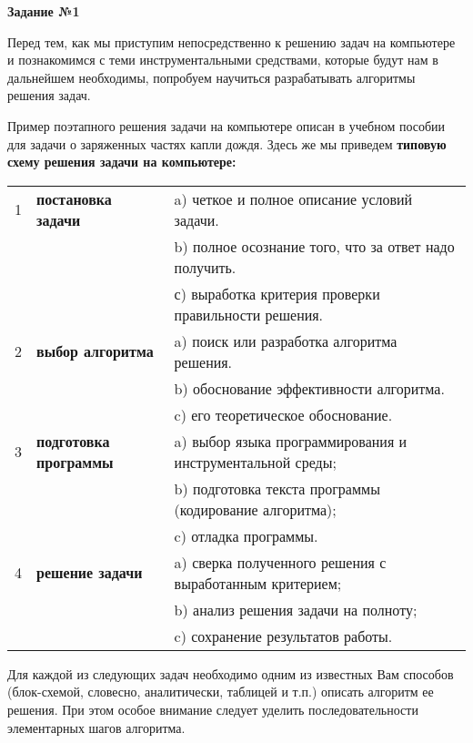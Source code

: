 {\bf Задание №1}

Перед тем, как мы приступим непосредственно к решению задач на компьютере и познакомимся с теми инструментальными средствами, которые будут нам в дальнейшем необходимы, попро­буем научиться разрабатывать алгоритмы решения задач.

Пример поэтапного решения задачи на компьютере описан в учебном пособии для задачи о заряженных частях капли дождя. Здесь же мы приведем {\bf типовую схему решения задачи на компьютере:}
\vspace{5mm}

\begin{tabular}{ | l | l | l | }
\hline
1 & {\bf постановка задачи} & a) четкое и полное описание условий задачи. \\ 
    &                                                  & b) полное осознание того, что за ответ надо получить. \\ 
    &                                                  & с) выработка критерия проверки правильности решения. \\ \hline
2 & {\bf выбор алгоритма}   & a) поиск или разработка алгоритма решения. \\ 
   &                                                  & b) обоснование эффективности алгоритма. \\ 
   &                                                  &c) его теоретическое обоснование.\\ \hline
3 & {\bf подготовка программы} & a) выбор языка программирования и инструментальной среды;  \\ 
   &                                                            &b) подготовка текста программы (кодирование алгоритма);\\ 
   &                                                            &c) отладка программы.\\ \hline
4 & {\bf решение задачи} & a)  сверка полученного решения с выработанным критерием; \\
   &                                              &b) анализ решения задачи на полноту;\\ 
   &                                              &c) сохранение результатов работы.\\ 
\hline
\end{tabular}

\vspace{5mm}
Для каждой из следующих задач необходимо одним из известных Вам способов (блок-схемой, словесно, аналитически, таблицей и т.п.) описать алгоритм ее решения. При этом особое внимание следует уделить последовательности элементарных ша­гов алгоритма.

